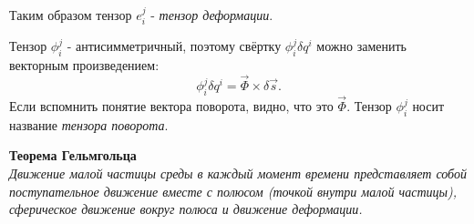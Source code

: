 Таким образом тензор \( e^j_{i} \) - \textit{тензор деформации}.

Тензор \( \phi^j_{i} \) - антисимметричный, поэтому свёртку
\( \phi^j_{i}\delta q^i \) можно заменить векторным произведением:
\[
    \phi^j_{i}\delta q^i = \vec{\Phi} \times \delta\vec{s}.
\]
Если вспомнить понятие вектора поворота, видно, что это \( \vec{\Phi} \).
Тензор \( \phi^j_{i} \) носит название \emph{тензора поворота}.

\textbf{Теорема Гельмгольца}\\
\textit{Движение малой частицы среды в каждый момент времени представляет
собой поступательное движение вместе с полюсом (точкой внутри малой частицы),
сферическое движение вокруг полюса и движение деформации.}

\newpage
